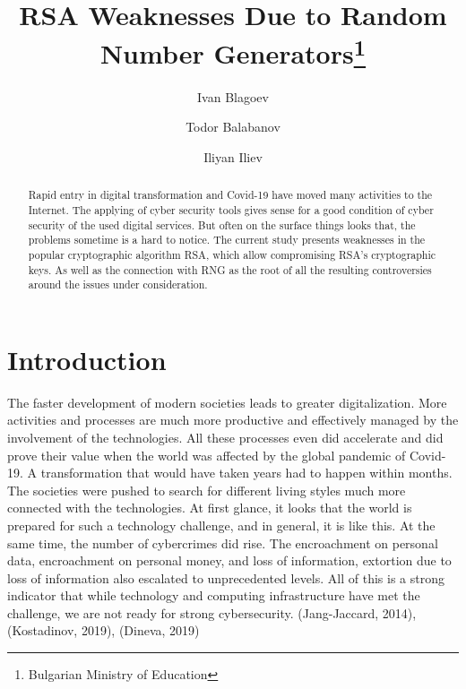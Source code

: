 \documentclass[runningheads]{llncs}
\begin{document}
\title{RSA Weaknesses Due to Random Number Generators\thanks{Bulgarian Ministry of Education}}


\author{Ivan Blagoev \and
Todor Balabanov \and
Iliyan Iliev}



\maketitle

\begin{abstract}
Rapid entry in digital transformation and Covid-19 have moved many activities to the Internet. The applying of cyber security tools gives sense for a good condition of cyber security of the used digital services. But often on the surface things looks that, the problems sometime is a hard to notice. The current study presents weaknesses in the popular cryptographic algorithm RSA, which allow compromising RSA's cryptographic keys. As well as the connection with RNG as the root of all the resulting controversies around the issues under consideration.

\end{abstract}

\section{Introduction}
\label{sec:1}

The faster development of modern societies leads to greater digitalization. More activities and processes are much more productive and effectively managed by the involvement of the technologies. All these processes even did accelerate and did prove their value when the world was affected by the global pandemic of Covid-19. A transformation that would have taken years had to happen within months. The societies were pushed to search for different living styles much more connected with the technologies. At first glance, it looks that the world is prepared for such a technology challenge, and in general, it is like this. At the same time, the number of cybercrimes did rise. The encroachment on personal data, encroachment on personal money, and loss of information, extortion due to loss of information also escalated to unprecedented levels. All of this is a strong indicator that while technology and computing infrastructure have met the challenge, we are not ready for strong cybersecurity. (Jang-Jaccard, 2014), (Kostadinov, 2019), (Dineva, 2019)
\end{document}
